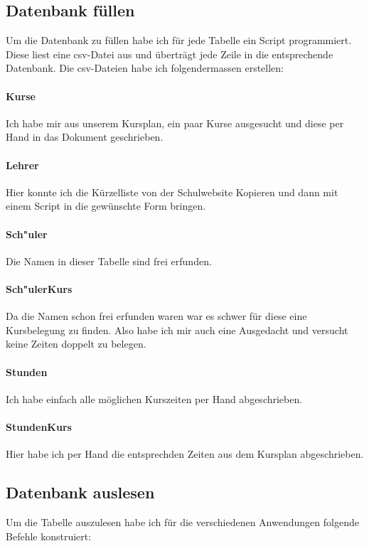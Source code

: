 \documentclass[a4paper, 12pt]{article}
\theoremstyle{plain}
\theoremstyle{definition}
\begin{document}
	\subsection{Datenbank füllen}
	Um die Datenbank zu füllen habe ich für jede Tabelle ein Script programmiert. Diese liest eine csv-Datei aus und überträgt jede Zeile in die entsprechende Datenbank. Die csv-Dateien habe ich folgendermassen erstellen:
	\paragraph{Kurse} Ich habe mir aus unserem Kursplan, ein paar Kurse ausgesucht und diese per Hand in das Dokument geschrieben.
	\paragraph{Lehrer} Hier konnte ich die Kürzelliste von der Schulwebsite Kopieren und dann mit einem Script in die gewünschte Form bringen.
	\paragraph{Sch"uler} Die Namen in dieser Tabelle sind frei erfunden.
	\paragraph{Sch"ulerKurs} Da die Namen schon frei erfunden waren war es schwer für diese eine Kursbelegung zu finden. Also habe ich mir auch eine Ausgedacht und versucht keine Zeiten doppelt zu belegen.
	\paragraph{Stunden} Ich habe einfach alle möglichen Kurszeiten per Hand abgeschrieben.
	\paragraph{StundenKurs} Hier habe ich per Hand die entsprechden Zeiten aus dem Kursplan abgeschrieben.
	\subsection{Datenbank auslesen}
	Um die Tabelle auszulesen habe ich für die verschiedenen Anwendungen folgende Befehle konstruiert:
\end{document}
